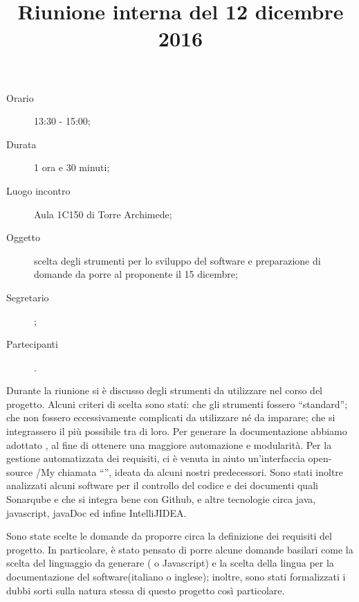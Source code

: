 


\author{\PB}
\supervisor{\MM}
\title{Riunione interna del 12 dicembre 2016}



\maketitle

\begin{description}
	\item[Orario] 13:30 - 15:00;
	\item[Durata] 1 ora e 30 minuti;
	\item[Luogo incontro] Aula 1C150 di Torre Archimede;
	\item[Oggetto] scelta degli strumenti per lo sviluppo del software e preparazione di domande da porre al proponente il 15 dicembre;
	\item[Segretario] \PB; 
	\item[Partecipanti] \ALL.
\end{description}

Durante la riunione si è discusso degli strumenti da utilizzare nel corso del progetto. Alcuni criteri di scelta sono stati: che gli strumenti fossero “standard”; che non fossero eccessivamente complicati da utilizzare né da imparare; che si integrassero il più possibile tra di loro. Per generare la documentazione abbiamo adottato , al fine di ottenere una maggiore automazione e modularità. Per la gestione automatizzata dei requisiti, ci è venuta in aiuto un'interfaccia open-source /My chiamata “”, ideata da alcuni nostri predecessori. Sono stati inoltre analizzati alcuni software per il controllo del codice e dei documenti quali Sonarqube e  che si integra bene con Github, e altre tecnologie circa java, javascript, javaDoc ed infine IntelliJIDEA.

Sono state scelte le domande da proporre circa la definizione dei requisiti del progetto. In particolare, è stato pensato di porre alcune domande basilari come la scelta del linguaggio da generare ( o Javascript) e la scelta della lingua per la documentazione del software(italiano o inglese); inoltre, sono stati formalizzati i dubbi sorti sulla natura stessa di questo progetto così particolare.


